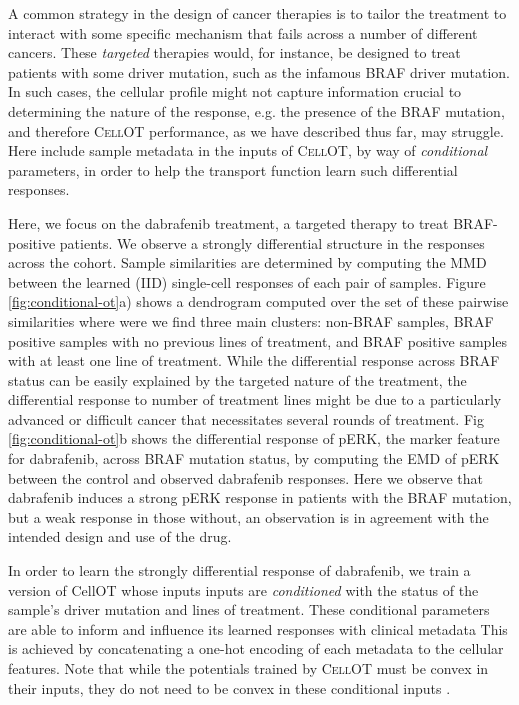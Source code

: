 A common strategy in the design of cancer therapies is to tailor the treatment to interact with some specific mechanism that fails across a number of different cancers.
These \emph{targeted} therapies would, for instance, be designed to treat patients with some driver mutation, such as the infamous BRAF driver mutation.
In such cases, the cellular profile might not capture information crucial to determining the nature of the response, e.g. the presence of the BRAF mutation,
and therefore \textsc{CellOT} performance, as we have described thus far, may struggle.
Here include sample metadata in the inputs of \textsc{CellOT}, by way of \emph{conditional} parameters, in order to help the transport function learn such differential responses.

Here, we focus on the dabrafenib treatment, a targeted therapy to treat BRAF-positive patients.
We observe a strongly differential structure in the responses across the cohort.
Sample similarities are determined by computing the MMD between the learned (IID) single-cell responses of each pair of samples.
Figure \ref{fig:conditional-ot}a) shows a dendrogram computed over the set of these pairwise similarities where were we find three main clusters: non-BRAF samples, BRAF positive samples with no previous lines of treatment, and BRAF positive samples with at least one line of treatment.
While the differential response across BRAF status can be easily explained by the targeted nature of the treatment, the differential response to number of treatment lines might be due to a particularly advanced or difficult cancer that necessitates several rounds of treatment.
Fig \ref{fig:conditional-ot}b shows the differential response of pERK, the marker feature for dabrafenib, across BRAF mutation status, by computing the EMD of pERK between the control and observed dabrafenib responses.
Here we observe that dabrafenib induces a strong pERK response in patients with the BRAF mutation, but a weak response in those without,
an observation is in agreement with the intended design and use of the drug.

In order to learn the strongly differential response of dabrafenib,
we train a version of CellOT whose inputs inputs are \emph{conditioned} \cite{bunne2022} with the status of the sample's driver mutation and lines of treatment. 
These conditional parameters are able to inform and influence its learned responses with clinical metadata
This is achieved by concatenating a one-hot encoding of each metadata to the cellular features.
Note that while the potentials trained by \textsc{CellOT} must be convex in their inputs,
they do not need to be convex in these conditional inputs \cite{amos2017}.

